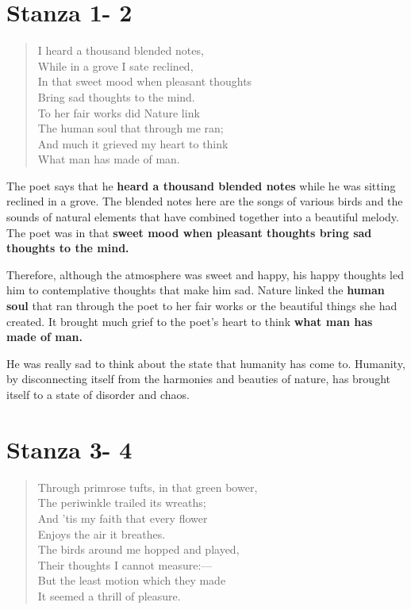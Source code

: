 \documentclass[a4paper,12pt]{book}
\begin{document}
\section{Stanza 1- 2}
\label{sec:org7ae7bbd}

\begin{verse}
I heard a thousand blended notes,\\[0pt]
While in a grove I sate reclined,\\[0pt]
In that sweet mood when pleasant thoughts\\[0pt]
Bring sad thoughts to the mind.\\[0pt]
To her fair works did Nature link\\[0pt]
The human soul that through me ran;\\[0pt]
And much it grieved my heart to think\\[0pt]
What man has made of man.\\[0pt]
\end{verse}

The poet says that he \textbf{heard a thousand blended notes} while he was sitting reclined in a grove. The blended notes here are the songs of various birds and the sounds of natural elements that have combined together into a beautiful melody. The poet was in that \textbf{sweet mood when pleasant thoughts bring sad thoughts to the mind.}

Therefore, although the atmosphere was sweet and happy, his happy thoughts led him to contemplative thoughts that make him sad. Nature linked the \textbf{human soul} that ran through the poet to her fair works or the beautiful things she had created. It brought much grief to the poet’s heart to think \textbf{what man has made of man.}

He was really sad to think about the state that humanity has come to. Humanity, by disconnecting itself from the harmonies and beauties of nature, has brought itself to a state of disorder and chaos.

\section{Stanza 3- 4}
\label{sec:org451fdd5}

\begin{verse}
Through primrose tufts, in that green bower,\\[0pt]
The periwinkle trailed its wreaths;\\[0pt]
And ’tis my faith that every flower\\[0pt]
Enjoys the air it breathes.\\[0pt]
The birds around me hopped and played,\\[0pt]
Their thoughts I cannot measure:—\\[0pt]
But the least motion which they made\\[0pt]
It seemed a thrill of pleasure.\\[0pt]
\end{verse}
\end{document}
